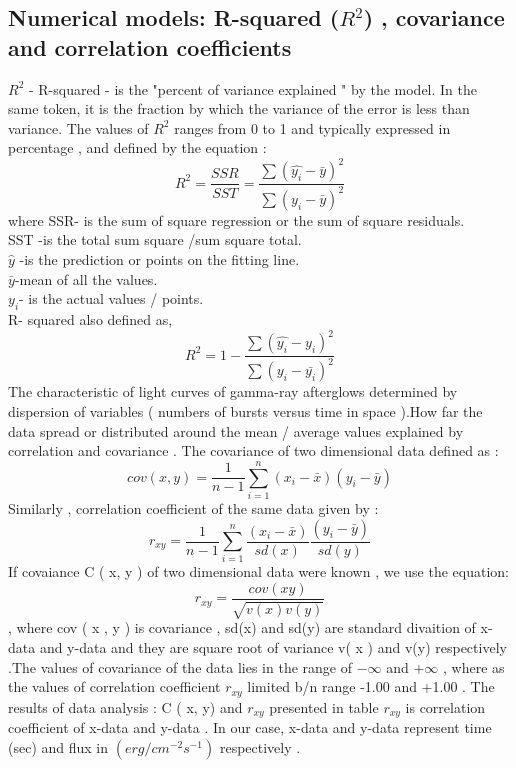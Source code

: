 \subsection{Numerical models: R-squared  ($ R^{2} $) , covariance and correlation coefficients}
\textbf{ $ R^{2}$ } - R-squared - is the "percent  of variance explained " by  the model. In the  same  token,  it  is   the fraction  by which the variance  of the  error is less than variance. The  values  of   $ R^{2} $  ranges  from  0 to 1  and  typically  expressed  in  percentage , and  defined by  the  equation :
\begin{equation}
R^{2}= \frac{SSR}{ SST}= \frac{\sum (\hat{y_{i}}-\bar{y})^{2}}{\sum(y_{i} -\bar{y})^{2}}
\end{equation}
where SSR- is the sum of square regression or the sum of square residuals.\\
SST -is the total sum square /sum square total.\\
$ \hat{y} $ -is the prediction  or points on the fitting  line.\\
$ \bar{y} $-mean  of all the  values.\\
$ y_{i} $- is  the actual  values / points.\\
  R- squared  also defined as,
 \begin{equation}
 R^{2}= 1- \frac{\sum (\hat{y_{i}}-y_{i})^{2}}{\sum(y_{i} -\bar{y_{i}})^{2}}
\end{equation}   
 The  characteristic  of light  curves  of  gamma-ray afterglows  determined   by   dispersion  of   variables ( numbers of  bursts  versus  time  in  space ).How  far  the   data   spread   or  distributed   around  the  mean / average   values  explained   by   correlation  and  covariance . The  covariance  of two dimensional  data defined as :
\begin{equation}
cov(x,y) = \frac{1}{n-1}\sum_{i=1}^{n}{(x_{i}- \bar{x} )}{(y_{i}-\bar{y} )}
\end{equation}   
Similarly ,  correlation  coefficient  of the same  data given by :  	 
\begin{equation}
r_{xy} = \frac{1}{n-1}\sum_{i=1}^{n}\frac{(x_{i}- \bar{x}  )}{sd(x)}\frac{(y_{i}-  \bar{y} )}{sd(y)}
\end{equation}
If   covaiance  C ( x, y ) of two dimensional  data  were  known , we  use the equation:
\begin{equation}
r_{xy} = \frac{cov(xy)}{\sqrt{v(x)v(y)}}
\end{equation},
where  cov ( x , y )  is   covariance ,  sd(x)  and  sd(y)  are  standard  divaition  of   x-data  and  y-data  and  they  are square root  of  variance  v( x ) and  v(y)  respectively .The  values  of  covariance  of the  data  lies   in  the  range  of   $-\infty$  and  $+\infty$ ,   where  as   the   values   of  correlation   coefficient  $ r_{xy} $  limited     b/n   range  -1.00   and  +1.00 . The  results  of  data analysis :  C ( x, y)  and  $ r_{xy} $  presented  in  table     $r_{xy}$  is  correlation   coefficient  of   x-data   and   y-data . In   our  case, x-data  and y-data  represent  time (sec)  and  flux  in  $(erg /cm^{-2} s^{-1}) $ respectively .	
